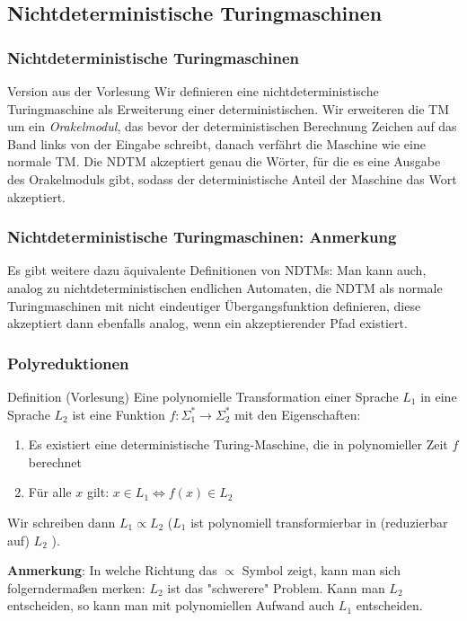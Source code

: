 \subsection{Nichtdeterministische Turingmaschinen}
\begin{frame}
\frametitle{Nichtdeterministische Turingmaschinen}

\begin{block}{Version aus der Vorlesung}
Wir definieren eine nichtdeterministische Turingmaschine als Erweiterung einer deterministischen.
 Wir erweiteren die TM um ein \emph{Orakelmodul}, das bevor der deterministischen Berechnung Zeichen auf das Band links von der Eingabe schreibt,
 danach verfährt die Maschine wie eine normale TM.
 Die NDTM akzeptiert genau die Wörter, für die es eine Ausgabe des Orakelmoduls gibt,
 sodass der deterministische Anteil der Maschine das Wort akzeptiert.
\end{block}
\end{frame}
\begin{frame}
\frametitle{Nichtdeterministische Turingmaschinen: Anmerkung}
Es gibt weitere dazu äquivalente Definitionen von NDTMs:
 Man kann auch, analog zu nichtdeterministischen endlichen Automaten, die NDTM als normale Turingmaschinen mit nicht eindeutiger Übergangsfunktion definieren,
 diese akzeptiert dann ebenfalls analog, wenn ein akzeptierender Pfad existiert.\\
\end{frame}

\begin{frame}
\frametitle{Polyreduktionen}
\begin{block}{Definition (Vorlesung)}
Eine polynomielle Transformation einer Sprache $L_1$ in eine Sprache $L_2$ ist eine Funktion
$f: \Sigma^*_1 \rightarrow \Sigma^*_2$ mit den Eigenschaften:
\begin{enumerate}
\item Es existiert eine deterministische Turing-Maschine, die in polynomieller Zeit $f$ berechnet
\item Für alle $x$ gilt: $x \in L_1 \iff f(x) \in  L_2$
\end{enumerate}
Wir schreiben dann $L_1 \propto L_2$ ($L_1$ ist polynomiell transformierbar in (reduzierbar auf) $L_2$ ).
\end{block}
\textbf{Anmerkung}: In welche Richtung das $\propto$ Symbol zeigt, kann man sich folgerndermaßen  merken:
$L_2$ ist das "schwerere" Problem. Kann man $L_2$ entscheiden, so kann man mit polynomiellen Aufwand auch $L_1$ entscheiden.
\end{frame}

